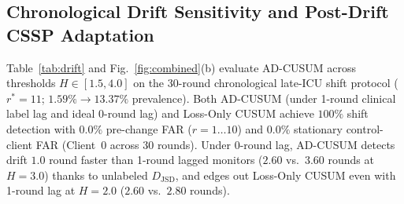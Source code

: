 \documentclass{llncs}
\begin{document}
\begin{table}[t]
\centering
\caption{Clinical operating-point analysis of FPDAF-v2 on held-out test windows ($N=102{,}994$, Seed~42). All non-default thresholds calibrated strictly on validation probabilities.}
\label{tab:thresholds}
\end{table}

\subsection{Chronological Drift Sensitivity and Post-Drift CSSP Adaptation}

Table~\ref{tab:drift} and Fig.~\ref{fig:combined}(b) evaluate AD-CUSUM across thresholds $H\in[1.5,4.0]$ on the 30-round chronological late-ICU shift protocol ($r^*=11$; $1.59\%\to 13.37\%$ prevalence). Both AD-CUSUM (under 1-round clinical label lag and ideal 0-round lag) and Loss-Only CUSUM achieve $100\%$ shift detection with $0.0\%$ pre-change FAR ($r=1\dots 10$) and $0.0\%$ stationary control-client FAR (Client~0 across 30 rounds). Under 0-round lag, AD-CUSUM detects drift $1.0$ round faster than 1-round lagged monitors ($2.60$ vs.\ $3.60$ rounds at $H=3.0$) thanks to unlabeled $D_{\mathrm{JSD}}$, and edges out Loss-Only CUSUM even with 1-round lag at $H=2.0$ ($2.60$ vs.\ $2.80$ rounds).
\end{document}
